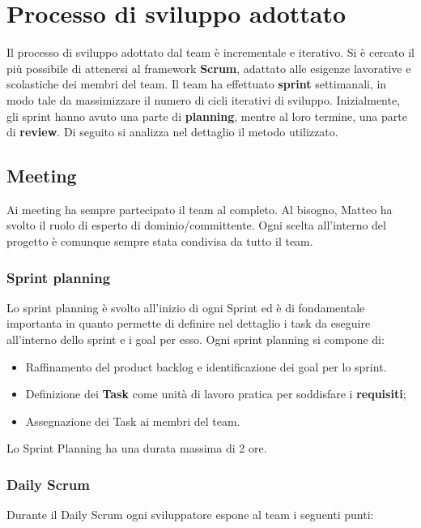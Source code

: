 \section{Processo di sviluppo adottato}


Il processo di sviluppo adottato dal team è incrementale e iterativo. Si è cercato il più possibile di attenersi al framework \textbf{Scrum}, adattato alle esigenze lavorative e scolastiche dei membri del team. 
Il team ha effettuato \textbf{sprint} settimanali, in modo tale da massimizzare il numero di cicli iterativi di sviluppo. 
Inizialmente, gli sprint hanno avuto una parte di \textbf{planning}, mentre al loro termine, una parte di \textbf{review}.
Di seguito si analizza nel dettaglio il metodo utilizzato.

\subsection{Meeting}
Ai meeting ha sempre partecipato il team al completo. Al bisogno, Matteo ha svolto il ruolo di esperto di dominio/committente. Ogni scelta all'interno del progetto è comunque sempre stata condivisa da tutto il team. 
\subsubsection{Sprint planning}
Lo sprint planning è svolto all'inizio di ogni Sprint ed è di fondamentale importanta in quanto permette di definire nel dettaglio i task da eseguire all'interno dello sprint e i goal per esso.
Ogni sprint planning si compone di:
\begin{itemize}
    \item Raffinamento del product backlog e identificazione dei goal per lo sprint.
    \item Definizione dei \textbf{Task} come unità di lavoro pratica per soddisfare i \textbf{requisiti};
    \item Assegnazione dei Task ai membri del team.
\end{itemize}
Lo Sprint Planning ha una durata massima di 2 ore.

\subsubsection{Daily Scrum}
Durante il Daily Scrum ogni sviluppatore espone al team i seguenti punti:

